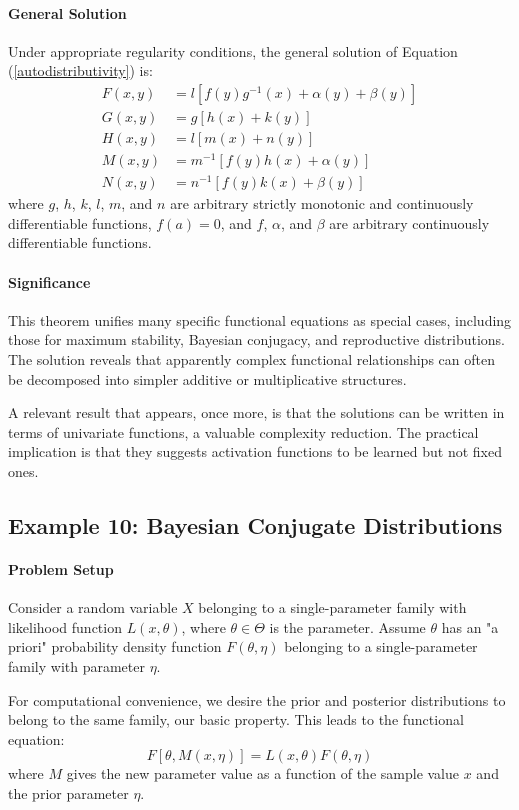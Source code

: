 \paragraph{General Solution}
Under appropriate regularity conditions, the general solution of Equation (\ref{autodistributivity}) is:
\begin{align}
F(x, y) &= l[f(y)g^{-1}(x) + \alpha(y) + \beta(y)] \\
G(x, y) &= g[h(x) + k(y)] \\
H(x, y) &= l[m(x) + n(y)] \\
M(x, y) &= m^{-1}[f(y)h(x) + \alpha(y)] \\
N(x, y) &= n^{-1}[f(y)k(x) + \beta(y)]
\end{align}
where $g$, $h$, $k$, $l$, $m$, and $n$ are arbitrary strictly monotonic and continuously differentiable functions, $f(a) = 0$, and $f$, $\alpha$, and $\beta$ are arbitrary continuously differentiable functions.

\paragraph{Significance}
This theorem unifies many specific functional equations as special cases, including those for maximum stability, Bayesian conjugacy, and reproductive distributions. The solution reveals that apparently complex functional relationships can often be decomposed into simpler additive or multiplicative structures.

A relevant result that appears, once more, is that the solutions can be written in terms of univariate functions, a valuable complexity reduction. The practical implication is that they suggests activation functions to be learned but not fixed ones.

\subsection{Example 10: Bayesian Conjugate Distributions}
\paragraph{Problem Setup}
Consider a random variable $X$ belonging to a single-parameter family with likelihood function $L(x, \theta)$, where $\theta \in \Theta$ is the parameter. Assume $\theta$ has an "a priori" probability density function $F(\theta, \eta)$ belonging to a single-parameter family with parameter $\eta$.

For computational convenience, we desire the prior and posterior distributions to belong to the same family, our basic property. This leads to the functional equation:
\begin{equation}
    F[\theta, M(x, \eta)] = L(x, \theta)F(\theta, \eta)
\end{equation}
where $M$ gives the new parameter value as a function of the sample value $x$ and the prior parameter $\eta$.

